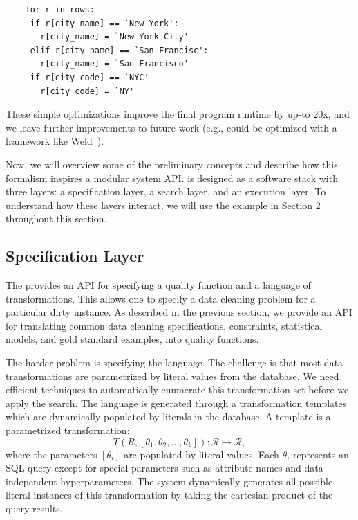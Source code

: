 


{\small
\begin{lstlisting}
    for r in rows:
     if r[city_name] == `New York':
       r[city_name] = `New York City'
     elif r[city_name] == `San Francisc':
       r[city_name] = `San Francisco'
     if r[city_code] == `NYC'
       r[city_code] = `NY'
\end{lstlisting}
}
These simple optimizations improve the final program runtime by up-to 20x, and we leave further improvements to future work (e.g., could be optimized with a framework like Weld~\cite{palkar2017weld}).
\fi




Now, we will overview some of the preliminary concepts and describe how this formalism inspires a modular system API.
\sys is designed as a software stack with three layers: a specification layer, a search layer, and an execution layer.
To understand how these layers interact, we will use the example in Section 2 throughout this section.


\subsection{Specification Layer} The provides an API for specifying a quality function and a language of transformations. This allows one to specify a data cleaning problem for a particular dirty instance. As described in the previous section, we provide an API for translating common data cleaning specifications, constraints, statistical models, and gold standard examples, into quality functions. 

The harder problem is specifying the language. 
The challenge is that most data transformations are parametrized by literal values from the database.
We need efficient techniques to automatically enumerate this transformation set before we apply the search.
The language is generated through a transformation templates which are dynamically populated by literals in the database.
A template is a parametrized transformation:
\[T(R, [\theta_1, \theta_2,...,\theta_k] ): \mathcal{R} \mapsto  \mathcal{R},\] where the parameters $[\theta_i]$ are populated by literal values.
Each $\theta_i$ represents an SQL query except for special parameters such as attribute names and data-independent hyperparameters.
The system dynamically generates all possible literal instances of this transformation by taking the cartesian product of the query results.


